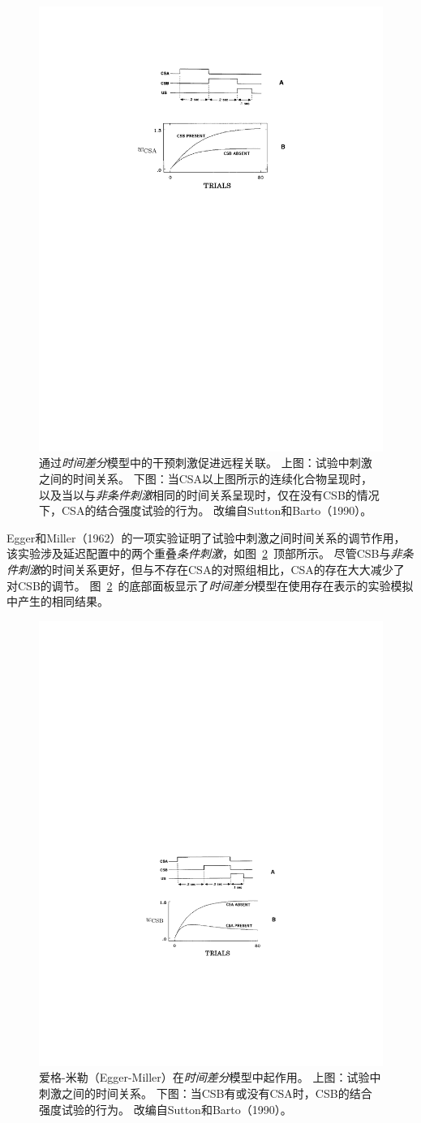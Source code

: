{\begin{figure}[!htb]
	\centering
	\includegraphics[width=0.5\linewidth]{chap11/fig_11_2}
	\caption{通过\textit{时间差分}模型中的干预刺激促进远程关联。
		上图：试验中刺激之间的时间关系。
		下图：当CSA以上图所示的连续化合物呈现时，以及当以与\textit{非条件刺激}相同的时间关系呈现时，仅在没有CSB的情况下，CSA的结合强度试验的行为。
		改编自Sutton和Barto（1990）。  \label{fig:11_2}}
\end{figure}


Egger和Miller（1962）的一项实验证明了试验中刺激之间时间关系的调节作用，该实验涉及延迟配置中的两个重叠\textit{条件刺激}，如图~\ref{fig:11_3}~顶部所示。
尽管CSB与\textit{非条件刺激}的时间关系更好，但与不存在CSA的对照组相比，CSA的存在大大减少了对CSB的调节。
图~\ref{fig:11_3}~的底部面板显示了\textit{时间差分}模型在使用存在表示的实验模拟中产生的相同结果。

\begin{figure}[!htb]
	\centering
	\includegraphics[width=0.5\linewidth]{chap11/fig_11_3}
	\caption{爱格-米勒（Egger-Miller）在\textit{时间差分}模型中起作用。
		上图：试验中刺激之间的时间关系。
		下图：当CSB有或没有CSA时，CSB的结合强度试验的行为。
		改编自Sutton和Barto（1990）。  \label{fig:11_3}}
\end{figure}
	
}
